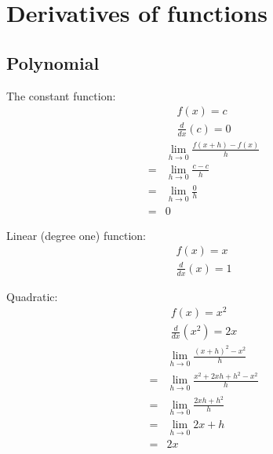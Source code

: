 \documentclass{article}
\theoremstyle{mytheoremstyle}
\theoremstyle{mytheoremstyle}
\theoremstyle{myproblemstyle}
\begin{document}
    \section*{Derivatives of functions}
    \subsection*{Polynomial}
    The constant function:
    \begin{align*}
        f(x) = c \\
        \frac{d}{dx} (c) = 0
    \end{align*}
    \begin{align*}
        &\lim_{h\to 0} \frac{f(x+h)-f(x)}{h} \\
        =&\lim_{h\to 0} \frac{c-c}{h} \\
        =&\lim_{h\to 0} \frac{0}{h} \\
        =& 0
    \end{align*}

    Linear (degree one) function:
    \begin{align*}
        f(x)=x \\
        \frac{d}{dx} (x) = 1
    \end{align*}

    Quadratic:
    \begin{align*}
        f(x)=x^2 \\
        \frac{d}{dx} (x^2) = 2x
    \end{align*}
    \begin{align*}
        &\lim_{h\to 0} \frac{(x+h)^2-x^2}{h} \\
        =&\lim_{h\to 0} \frac{x^2+2xh+h^2-x^2}{h} \\
        =&\lim_{h\to 0} \frac{2xh+h^2}{h} \\
        =&\lim_{h\to 0} 2x+h \\
        =&2x
    \end{align*}
\end{document}
